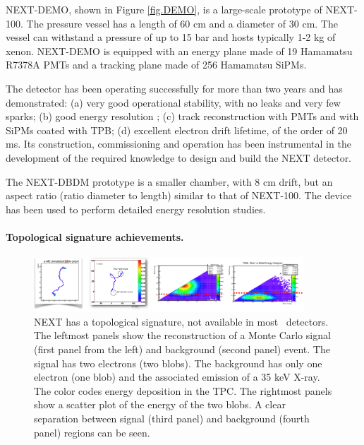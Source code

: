 NEXT-DEMO, shown in Figure \ref{fig.DEMO}, is a large-scale prototype of NEXT-100. The pressure vessel has a length of 60 cm and a diameter of 30 cm. The vessel can withstand a pressure of up to 15 bar and hosts typically 1-2 kg of xenon. NEXT-DEMO is  equipped with an energy plane made of 19 Hamamatsu R7378A PMTs and a tracking plane made of 256 Hamamatsu SiPMs. 

The detector has been operating successfully for more than two years and has demonstrated: (a) very good operational stability, with no leaks and very few sparks; (b) good energy resolution ; (c) track reconstruction with PMTs and with SiPMs coated with TPB; (d) excellent electron drift lifetime, of the order of 20 ms. Its construction, commissioning and operation has been instrumental in the development of the required knowledge to design and build the NEXT detector.

The NEXT-DBDM prototype is a smaller chamber, with 8 cm drift, but an aspect ratio (ratio diameter to length) similar to that of NEXT-100. The device has been used to perform detailed energy resolution studies. 

\paragraph{Topological signature achievements.}
\begin{figure}
\centering
\includegraphics[width=0.9\textwidth]{img/Topo2.png}
\caption{\small NEXT has a topological signature, not available in most \bbonu\ detectors. The leftmost panels show the reconstruction of a Monte Carlo signal (first panel from the left) and background (second panel) event. The signal has two electrons (two blobs). The background has only one electron (one blob) and the associated emission of a 35 keV X-ray. The color codes energy deposition in the TPC. The rightmost panels show a scatter plot of the energy of the two blobs. A clear separation between signal (third panel) and background (fourth panel) regions can be seen.}\label{fig.ETRK2}
\end{figure}

%

